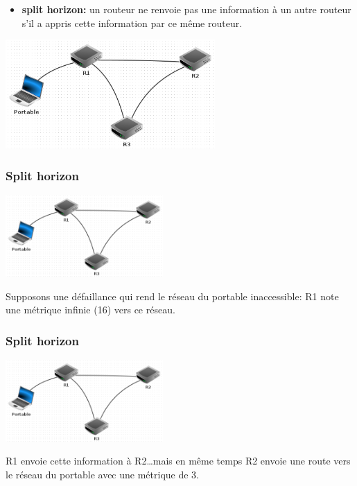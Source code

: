 \documentclass[svgnames,11pt]{beamer}
\begin{document}
\begin{frame}
    \frametitle{}

    \begin{itemize}
        \item\textbf{split horizon:} un routeur ne renvoie pas une information à un autre routeur s’il a appris cette information par ce même routeur.
    \end{itemize}
\begin{center}
\centering
\includegraphics[width=8cm]{ressources/split.png}
\label{IMG}
\end{center}
\end{frame}

\begin{frame}
    \frametitle{Split horizon}

    \begin{center}
        \centering
        \includegraphics[width=6cm]{ressources/split.png}
        \label{IMG}
        \end{center}
Supposons une défaillance qui rend le réseau du portable inaccessible: R1 note une métrique infinie (16) vers ce réseau.
\end{frame}
\begin{frame}
    \frametitle{Split horizon}

    \begin{center}
        \centering
        \includegraphics[width=6cm]{ressources/split.png}
        \label{IMG}
        \end{center}
R1 envoie cette information à R2\dots mais en même temps R2 envoie une route vers le réseau du portable avec une métrique de 3.
\end{frame}
\end{document}
